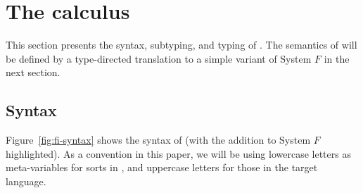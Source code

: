 \section{The \name calculus} \label{sec:fi}

This section presents the syntax, subtyping, and typing of \name.  The
semantics of \name will be defined by a type-directed translation
to a simple variant of System $F$ in the next section.

\subsection{Syntax}

Figure~\ref{fig:fi-syntax} shows the syntax of \name (with the addition to
System $F$ highlighted). As a convention in this paper, we will be using
lowercase letters as meta-variables for sorts in \name, and uppercase letters
for those in the target language.


